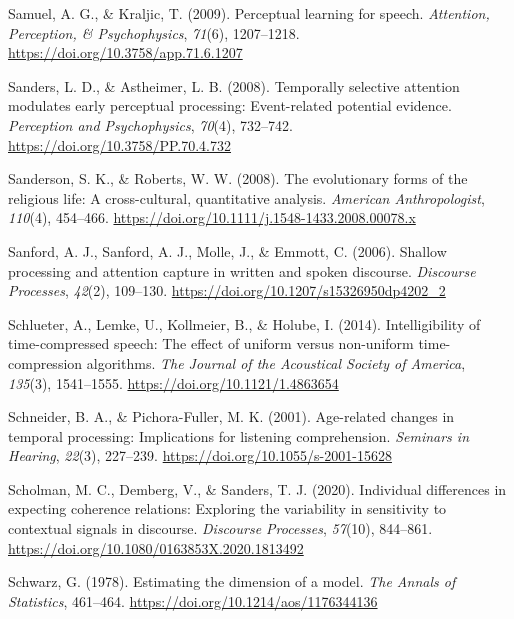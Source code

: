 \documentclass[a4paper, nobind]{templates/ociamthesis}
\newlength{\cslhangindent}
\newenvironment{CSLReferences}[2] %
 {%
  \setlength{\parindent}{0pt}
  \ifodd #1
  \let\oldpar\par
  \def\par{\hangindent=\cslhangindent\oldpar}
  \fi
  \setlength{\parskip}{1mm}
  \setlength{\baselineskip}{6mm}
 }%
 {}
\begin{document}
\begin{CSLReferences}{1}{0}
\leavevmode{}%
Samuel, A. G., \& Kraljic, T. (2009). Perceptual learning for speech. \emph{Attention, Perception, \& Psychophysics}, \emph{71}(6), 1207--1218. \url{https://doi.org/10.3758/app.71.6.1207}

\leavevmode{}%
Sanders, L. D., \& Astheimer, L. B. (2008). {Temporally selective attention modulates early perceptual processing: Event-related potential evidence}. \emph{Perception and Psychophysics}, \emph{70}(4), 732--742. \url{https://doi.org/10.3758/PP.70.4.732}

\leavevmode{}%
Sanderson, S. K., \& Roberts, W. W. (2008). {The evolutionary forms of the religious life: A cross-cultural, quantitative analysis}. \emph{American Anthropologist}, \emph{110}(4), 454--466. \url{https://doi.org/10.1111/j.1548-1433.2008.00078.x}

\leavevmode{}%
Sanford, A. J., Sanford, A. J., Molle, J., \& Emmott, C. (2006). Shallow processing and attention capture in written and spoken discourse. \emph{Discourse Processes}, \emph{42}(2), 109--130. \url{https://doi.org/10.1207/s15326950dp4202_2}

\leavevmode{}%
Schlueter, A., Lemke, U., Kollmeier, B., \& Holube, I. (2014). {Intelligibility of time-compressed speech: The effect of uniform versus non-uniform time-compression algorithms}. \emph{The Journal of the Acoustical Society of America}, \emph{135}(3), 1541--1555. \url{https://doi.org/10.1121/1.4863654}

\leavevmode{}%
Schneider, B. A., \& Pichora-Fuller, M. K. (2001). Age-related changes in temporal processing: Implications for listening comprehension. \emph{Seminars in Hearing}, \emph{22}(3), 227--239. \url{https://doi.org/10.1055/s-2001-15628}

\leavevmode{}%
Scholman, M. C., Demberg, V., \& Sanders, T. J. (2020). Individual differences in expecting coherence relations: Exploring the variability in sensitivity to contextual signals in discourse. \emph{Discourse Processes}, \emph{57}(10), 844--861. \url{https://doi.org/10.1080/0163853X.2020.1813492}

\leavevmode{}%
Schwarz, G. (1978). Estimating the dimension of a model. \emph{The Annals of Statistics}, 461--464. \url{https://doi.org/10.1214/aos/1176344136}


\end{CSLReferences}
\end{document}
